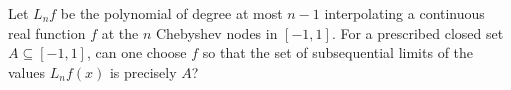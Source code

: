 Let $L_nf$ be the polynomial of degree at most $n-1$ interpolating a continuous real function $f$ at the $n$ Chebyshev nodes in $[-1,1]$. For a prescribed closed set $A\subseteq[-1,1]$, can one choose $f$ so that the set of subsequential limits of the values $L_nf(x)$ is precisely $A$?
